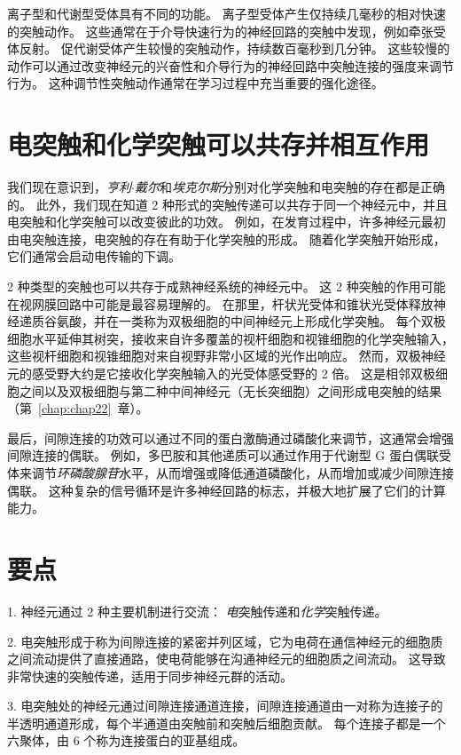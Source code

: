 离子型和代谢型受体具有不同的功能。
离子型受体产生仅持续几毫秒的相对快速的突触动作。
这些通常在于介导快速行为的神经回路的突触中发现，例如牵张受体反射。
促代谢受体产生较慢的突触动作，持续数百毫秒到几分钟。
这些较慢的动作可以通过改变神经元的兴奋性和介导行为的神经回路中突触连接的强度来调节行为。
这种调节性突触动作通常在学习过程中充当重要的强化途径。




\section{电突触和化学突触可以共存并相互作用}

我们现在意识到，\textit{亨利$\cdot$戴尔}和\textit{埃克尔斯}分别对化学突触和电突触的存在都是正确的。
此外，我们现在知道 2 种形式的突触传递可以共存于同一个神经元中，并且电突触和化学突触可以改变彼此的功效。
例如，在发育过程中，许多神经元最初由电突触连接，电突触的存在有助于化学突触的形成。
随着化学突触开始形成，它们通常会启动电传输的下调。


2 种类型的突触也可以共存于成熟神经系统的神经元中。
这 2 种突触的作用可能在视网膜回路中可能是最容易理解的。
在那里，杆状光受体和锥状光受体释放神经递质谷氨酸，并在一类称为双极细胞的中间神经元上形成化学突触。
每个双极细胞水平延伸其树突，接收来自许多覆盖的视杆细胞和视锥细胞的化学突触输入，这些视杆细胞和视锥细胞对来自视野非常小区域的光作出响应。
然而，双极神经元的感受野大约是它接收化学突触输入的光受体感受野的 2 倍。
这是相邻双极细胞之间以及双极细胞与第二种中间神经元（无长突细胞）之间形成电突触的结果（第~\ref{chap:chap22}~章）。


最后，间隙连接的功效可以通过不同的蛋白激酶通过磷酸化来调节，这通常会增强间隙连接的偶联。
例如，多巴胺和其他递质可以通过作用于代谢型 G 蛋白偶联受体来调节\textit{环磷酸腺苷}水平，从而增强或降低通道磷酸化，从而增加或减少间隙连接偶联。
这种复杂的信号循环是许多神经回路的标志，并极大地扩展了它们的计算能力。



\section{要点}

1. 神经元通过 2 种主要机制进行交流：
\textit{电}突触传递和\textit{化学}突触传递。


2. 电突触形成于称为间隙连接的紧密并列区域，它为电荷在通信神经元的细胞质之间流动提供了直接通路，使电荷能够在沟通神经元的细胞质之间流动。
这导致非常快速的突触传递，适用于同步神经元群的活动。 


3. 电突触处的神经元通过间隙连接通道连接，间隙连接通道由一对称为连接子的半透明通道形成，每个半通道由突触前和突触后细胞贡献。
每个连接子都是一个六聚体，由 6 个称为连接蛋白的亚基组成。


